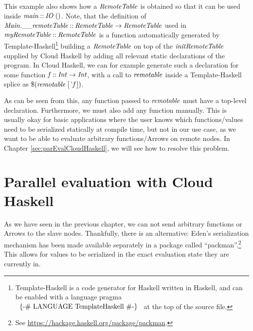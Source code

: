 \documentclass[paper=A4,twoside=true,openright,parskip=full,chapterprefix=true,headings=normal,bibliography=totoc,listof=totoc,titlepage=on,captions=tableabove,draft=false,british]{scrreprt}%
\renewcommand{\enquote}[1]{{``}#1{''}}
\begin{document}
This example also shows how a \ensuremath{\Conid{RemoteTable}} is obtained so that it can
be used inside \ensuremath{\Varid{main}\mathbin{::}\Conid{IO}\;()}. Note, that the definition of
\ensuremath{\mathbin{\Conid{Main}.\char95 \char95 }\Varid{remoteTable}\mathbin{::}\Conid{RemoteTable}\to \Conid{RemoteTable}} used in
\ensuremath{\Varid{myRemoteTable}\mathbin{::}\Conid{RemoteTable}} is a function automatically generated by
Template-Haskell\footnote{Template-Haskell is a code generator for
  Haskell written in Haskell, and can be enabled with a language pragma
  \ensuremath{\mbox{\enskip\{-\# LANGUAGE TemplateHaskell  \#-\}\enskip}} at the top of the source file.}
building a \ensuremath{\Conid{RemoteTable}} on top of the \ensuremath{\Varid{initRemoteTable}} supplied by
Cloud Haskell by adding all relevant static declarations of the program.
In Cloud Haskell, we can for example generate such a declaration for
some function \ensuremath{\Varid{f}\mathbin{::}\Conid{Int}\to \Conid{Int}}, with a call to \ensuremath{\Varid{remotable}} inside a
Template-Haskell splice as \ensuremath{\mathbin{\$}(\Varid{remotable}\;[\mskip1.5mu }'\ensuremath{\Varid{f}\mskip1.5mu])}.

As can be seen from this, any function passed to \ensuremath{\Varid{remotable}} must have a
top-level declaration. Furthermore, we must also add any function
manually. This is usually okay for basic applications where the user
knows which functions/values need to be serialized statically at compile
time, but not in our use case, as we want to be able to evaluate
arbitrary functions/Arrows on remote nodes. In Chapter
\ref{sec:parEvalCloudHaskell}, we will see how to resolve this problem.

\hypertarget{parallel-evaluation-with-cloud-haskell}{%
\section{Parallel evaluation with Cloud
Haskell}\label{parallel-evaluation-with-cloud-haskell}}

\label{sec:parEvalCloudHaskell}

As we have seen in the previous chapter, we can not send arbitrary
functions or Arrows to the slave nodes. Thankfully, there is an
alternative: Eden's serialization mechanism has been made available
separately in a package called \enquote{packman}.\footnote{See
  \url{https://hackage.haskell.org/package/packman}.} This allows for
values to be serialized in the exact evaluation state they are currently
in.
\end{document}

